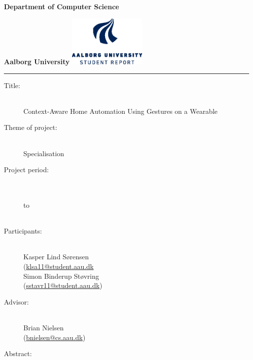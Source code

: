 {\setlength{\parindent}{0pt}
\begin{nopagebreak}
  \begin{minipage}{\textwidth}
    \vspace{2cm}
    \LARGE{\textbf{Department of Computer Science}}\vspace{-2.1cm}

    \large{\textbf{Aalborg University}}
    \hspace{8cm}\includegraphics[height=2.5cm]{images/aau_logo_en_blue.eps}
  \end{minipage}
  \vspace{0.1cm}
  \hrule

  \newcommand{\titleitem}[2]{\item[#1:] ~\\ #2 \\}
  \begin{multicols}{2}
  	\begin{description}
  		\titleitem{Title}{Context-Aware Home Automation Using Gestures on a Wearable}
  		\titleitem{Theme of project}{Specialisation}
  		\titleitem{Project period}{\protect{}\\ to\\ \protect\formatdate{8}{6}{2016}}
  		\titleitem{Participants}{
  			Kasper Lind Sørensen \\(\url{klsa11@student.aau.dk}\\
  			Simon Binderup Støvring \\(\url{sstavr11@student.aau.dk})
  			}
  		\titleitem{Advisor}{Brian Nielsen\\(\url{bnielsen@cs.aau.dk})}
  	\end{description}
    \vfill
    \columnbreak

    \begin{description}
    	\titleitem{Abstract}{}
    \end{description}

  \end{multicols}
\end{nopagebreak}
}